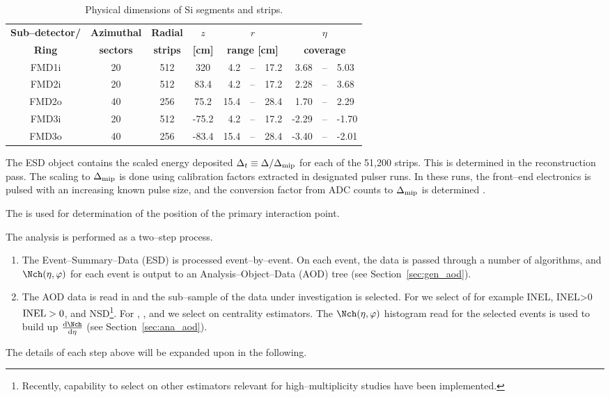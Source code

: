 \documentclass[compat,11pt]{alicenote}
\DeclareRobustCommand{\AlwaysText}[1]{\ifmmode\relax\text{#1}\else #1\fi}
\newcommand*\INEL{\AlwaysText{INEL}}
\newcommand*\NSD{\AlwaysText{NSD}}
\newcommand*\INELGT{\ifmmode\INEL>0\else$\INEL>0$\fi}
\let\INELONE\INELGT
\newcommand*{\etaphi}{\ensuremath(\eta,\varphi)}
\newcommand*\ESD{\AlwaysText{ESD}}
\newcommand{\AOD}{\AlwaysText{AOD}}
\newcommand{\secref}[1]{Section~\ref{#1}}
\newcommand{\DeltaMip}{\ensuremath\Delta_{\text{mip}}}
\newcommand{\dndetadphi}[1][]{{\ensuremath%
    \ifx|#1|\else\left.\fi%
      \Nch\etaphi%
      \ifx|#1|\else\right|_{#1}\fi}}
\newcommand\headColor{\rowcolor{alicered!25!white}}
\newcommand\altRowColor{\rowcolor{aliceyellow!25!white}}
\begin{document}
\begin{table}[htbp]
  \begin{center}
    \caption{Physical dimensions of Si segments and strips.}
    \label{tab:fmd:overview}
    \begin{tabular}{|c|cc|crcl|rcl|}
      \hline
      \headColor%
      \textbf{Sub--detector/} &
      \textbf{Azimuthal}&
      \textbf{Radial} &
      $z$ &
      \multicolumn{3}{c|}{\textbf{$r$}} &
      \multicolumn{3}{c|}{\textbf{$\eta$}} \\ 
      \rowcolor{alicered!25!white}
      \textbf{Ring}&  
      \textbf{sectors} &
      \textbf{strips} & 
      \textbf{[cm]} &
      \multicolumn{3}{c|}{\textbf{range [cm]}} &
      \multicolumn{3}{c|}{\textbf{coverage}} \\
      \hline
      FMD1i & 20& 512& 320  &  4.2&--&17.2& 3.68&--&5.03\\
      \altRowColor{}%
      FMD2i & 20& 512&  83.4&  4.2&--&17.2& 2.28&--&3.68\\
      FMD2o & 40& 256&  75.2& 15.4&--&28.4& 1.70&--&2.29\\
      \altRowColor{}%
      FMD3i & 20& 512& -75.2&  4.2&--&17.2&-2.29&--&-1.70\\
      FMD3o & 40& 256& -83.4& 15.4&--&28.4&-3.40&--&-2.01\\
      \hline
    \end{tabular}
  \end{center}
\end{table}

The \FMD{} \ESD{} object contains the scaled energy deposited
$\Delta_t\equiv\Delta /\DeltaMip$ for each of the 51,200 strips.  This
is determined in the reconstruction pass.  The scaling to $\DeltaMip$
is done using calibration factors extracted in designated pulser runs.
In these runs, the front--end electronics is pulsed with an increasing
known pulse size, and the conversion factor from ADC counts to
$\DeltaMip$ is determined \cite{cholm:2009}.

The \SPD{} is used for determination of the position of the primary
interaction point.

The analysis is performed as a two--step process.  
\begin{enumerate}
\item The Event--Summary--Data (\ESD{}) is processed event--by--event.
  On each event, the data is passed through a number of algorithms,
  and $\dndetadphi$ for each event is output to an
  Analysis--Object--Data (\AOD{}) tree (see \secref{sec:gen_aod}).
\item The \AOD{} data is read in and the sub--sample of the data under
  investigation is selected. For \ppCol{} we select of for example
  \INEL{}, \INELONE{}, and \NSD{}\footnote{Recently, capability to
    select on other estimators relevant for high--multiplicity studies
    have been implemented.}. For \PbPbCol{}, \pPbCol{}, and \PbpCol{}
  we select on centrality estimators.  The $\dndetadphi$ histogram
  read for the selected events is used to build up $\dndeta$ (see
  \secref{sec:ana_aod}).
\end{enumerate}
The details of each step above will be expanded upon in the
following. 
\end{document}

